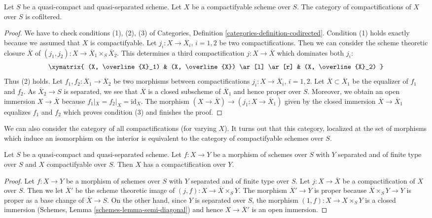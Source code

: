 \begin{lemma}
\label{lemma-compactifications-cofiltered}
Let $S$ be a quasi-compact and quasi-separated scheme.
Let $X$ be a compactifyable scheme over $S$.
The category of compactifications of $X$ over $S$ is
cofiltered.
\end{lemma}

\begin{proof}
We have to check conditions (1), (2), (3) of
Categories, Definition \ref{categories-definition-codirected}.
Condition (1) holds exactly because we assumed that $X$
is compactifyable.
Let $j_i : X \to \overline{X}_i$, $i = 1, 2$ be two compactifications.
Then we can consider the scheme theoretic closure $\overline{X}$
of $(j_1, j_2) : X \to \overline{X}_1 \times_S \overline{X}_2$.
This determines a third compactification $j : X \to \overline{X}$
which dominates both $j_i$:
$$
\xymatrix{
(X, \overline{X}_1) & (X, \overline{X}) \ar[l] \ar[r] & (X, \overline{X}_2)
}
$$
Thus (2) holds. Let $f_1, f_2 : \overline{X}_1 \to \overline{X}_2$
be two morphisms between compactifications
$j_i : X \to \overline{X}_i$, $i = 1, 2$.
Let $\overline{X} \subset \overline{X}_1$ be the equalizer of
$f_1$ and $f_2$. As $\overline{X}_2 \to S$ is separated, we see
that $\overline{X}$ is a closed subscheme of $\overline{X}_1$
and hence proper over $S$. Moreover, we obtain an
open immersion $X \to \overline{X}$ because $f_1|_X = f_2|_X = \text{id}_X$.
The morphism $(X \to \overline{X}) \to (j_1 : X \to \overline{X}_1)$
given by the closed immersion $\overline{X} \to \overline{X}_1$
equalizes $f_1$ and $f_2$ which proves condition (3) and
finishes the proof.
\end{proof}

\noindent
We can also consider the category of all compactifications (for varying $X$).
It turns out that this category, localized at the set of morphisms
which induce an isomorphism on the interior
is equivalent to the category of compactifyable schemes over $S$.

\begin{lemma}
\label{lemma-compactifyable}
Let $S$ be a quasi-compact and quasi-separated scheme. Let $f : X \to Y$
be a morphism of schemes over $S$ with $Y$ separated and of finite type
over $S$ and $X$ compactifyable over $S$. Then $X$ has a compactification
over $Y$.
\end{lemma}

\begin{proof}
Let $f : X \to Y$ be a morphism of schemes over $S$ with $Y$ separated
and of finite type over $S$. Let $j : X \to \overline{X}$ be a
compactification of $X$ over $S$. Then we let $\overline{X}'$ be
the scheme theoretic image of $(j, f) : X \to \overline{X} \times_S Y$.
The morphism $\overline{X}' \to Y$ is proper because
$\overline{X} \times_S Y \to Y$ is proper as a base change of
$\overline{X} \to S$. On the other hand, since $Y$ is separated
over $S$, the morphism $(1, f) : X \to X \times_S Y$ is a closed
immersion (Schemes, Lemma \ref{schemes-lemma-semi-diagonal})
and hence $X \to \overline{X}'$ is an open immersion.
\end{proof}

